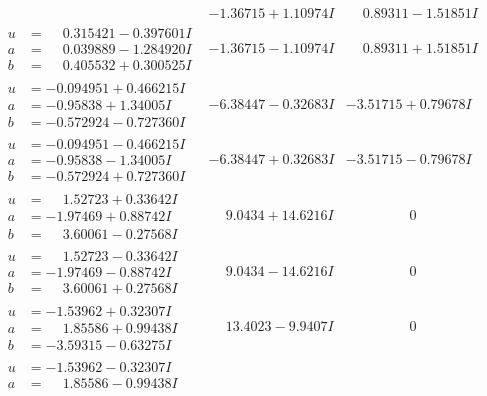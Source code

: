 \documentclass[1p]{elsarticle_modified}
\theoremstyle{definition}
\begin{document}
$$\begin{array}{c|c|c}
 & -1.36715 + 1.10974 I & \phantom{-}0.89311 - 1.51851 I \\ \hline\begin{aligned}
u &= \phantom{-}0.315421 - 0.397601 I \\
a &= \phantom{-}0.039889 - 1.284920 I \\
b &= \phantom{-}0.405532 + 0.300525 I\end{aligned}
 & -1.36715 - 1.10974 I & \phantom{-}0.89311 + 1.51851 I \\ \hline\begin{aligned}
u &= -0.094951 + 0.466215 I \\
a &= -0.95838 + 1.34005 I \\
b &= -0.572924 - 0.727360 I\end{aligned}
 & -6.38447 - 0.32683 I & -3.51715 + 0.79678 I \\ \hline\begin{aligned}
u &= -0.094951 - 0.466215 I \\
a &= -0.95838 - 1.34005 I \\
b &= -0.572924 + 0.727360 I\end{aligned}
 & -6.38447 + 0.32683 I & -3.51715 - 0.79678 I \\ \hline\begin{aligned}
u &= \phantom{-}1.52723 + 0.33642 I \\
a &= -1.97469 + 0.88742 I \\
b &= \phantom{-}3.60061 - 0.27568 I\end{aligned}
 & \phantom{-}9.0434 + 14.6216 I & \phantom{-0.000000 } 0 \\ \hline\begin{aligned}
u &= \phantom{-}1.52723 - 0.33642 I \\
a &= -1.97469 - 0.88742 I \\
b &= \phantom{-}3.60061 + 0.27568 I\end{aligned}
 & \phantom{-}9.0434 - 14.6216 I & \phantom{-0.000000 } 0 \\ \hline\begin{aligned}
u &= -1.53962 + 0.32307 I \\
a &= \phantom{-}1.85586 + 0.99438 I \\
b &= -3.59315 - 0.63275 I\end{aligned}
 & \phantom{-}13.4023 - 9.9407 I & \phantom{-0.000000 } 0 \\ \hline\begin{aligned}
u &= -1.53962 - 0.32307 I \\
a &= \phantom{-}1.85586 - 0.99438 I \\

\end{aligned}
\end{array}$$
\end{document}
